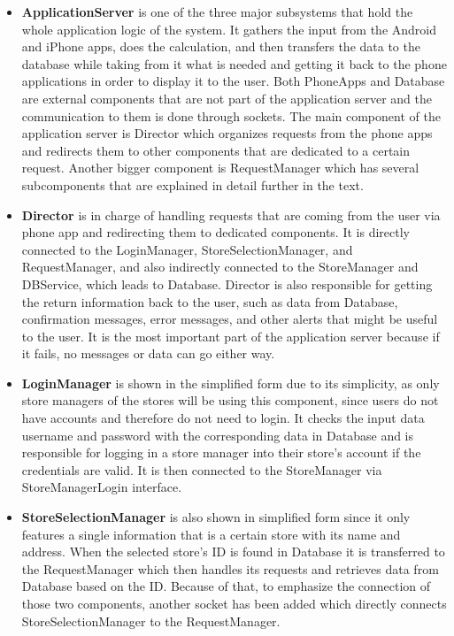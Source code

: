\begin{itemize}
\item \textbf{ApplicationServer} is one of the three major subsystems that hold the whole application logic of the system. It gathers the input from the Android and iPhone apps, does the calculation, and then transfers the data to the database while taking from it what is needed and getting it back to the phone applications in order to display it to the user. Both PhoneApps and Database are external components that are not part of the application server and the communication to them is done through sockets. The main component of the application server is Director which organizes requests from the phone apps and redirects them to other components that are dedicated to a certain request. Another bigger component is RequestManager which has several subcomponents that are explained in detail further in the text.  

\item \textbf{Director} is in charge of handling requests that are coming from the user via phone app and redirecting them to dedicated components. It is directly connected to the LoginManager, StoreSelectionManager, and RequestManager, and also indirectly connected to the StoreManager and DBService, which leads to Database. Director is also responsible for getting the return information back to the user, such as data from Database, confirmation messages, error messages, and other alerts that might be useful to the user. It is the most important part of the application server because if it fails, no messages or data can go either way.  

\item \textbf{LoginManager} is shown in the simplified form due to its simplicity, as only store managers of the stores will be using this component, since users do not have accounts and therefore do not need to login. It checks the input data username and password with the corresponding data in Database and is responsible for logging in a store manager into their store's account if the credentials are valid. It is then connected to the StoreManager via StoreManagerLogin interface. 

\item \textbf{StoreSelectionManager} is also shown in simplified form since it only features a single information that is a certain store with its name and address. When the selected store's ID is found in Database it is transferred to the RequestManager which then handles its requests and retrieves data from Database based on the ID. Because of that, to emphasize the connection of those two components, another socket has been added which directly connects StoreSelectionManager to the RequestManager.  


\end{itemize}
